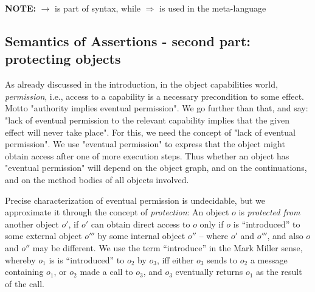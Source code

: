 \noindent
\textbf{NOTE:}   $\rightarrow$ is part of \AssertLang syntax, while  $\Longrightarrow$ is used in the meta-language



\subsection{Semantics of Assertions - second part:
protecting objects} %

\label{sect:protect}

As  already discussed in the introduction, in the object capabilities world, \emph{permission}, i.e.,  access   to a capability is a necessary precondition to some effect. Motto "authority implies eventual permission".
We go further than that, and say: "lack of eventual permission to the relevant capability implies that the given effect will never take place".
For this, we need the concept of "lack of  eventual permission".  We use "eventual permission" to express that the object might obtain access after one of more execution steps. Thus whether an object has "eventual permission" will depend on the object graph, and on the continuations, and on the method bodies of all objects involved.  

Precise characterization of eventual permission is undecidable, but we approximate it through the concept of \emph{protection}:
An object $o$ is \emph{protected  from} another object $o'$, if $o'$ can obtain direct access to   $o$ only if 
$o$ is ``introduced'' to some external object $o'''$ by some internal object $o''$ -- where $o'$ and $o'''$, and also $o$ and $o''$ may be different.  We  use the term ``introduce'' in the Mark Miller sense, whereby $o_1$ is is ``introduced'' to $o_2$ by $o_3$, iff either $o_3$ sends to $o_2$ a message containing $o_1$, 
or $o_2$ made a call to $o_3$, and $o_3$ eventually returns  $o_1$ as the result of the call.
 

